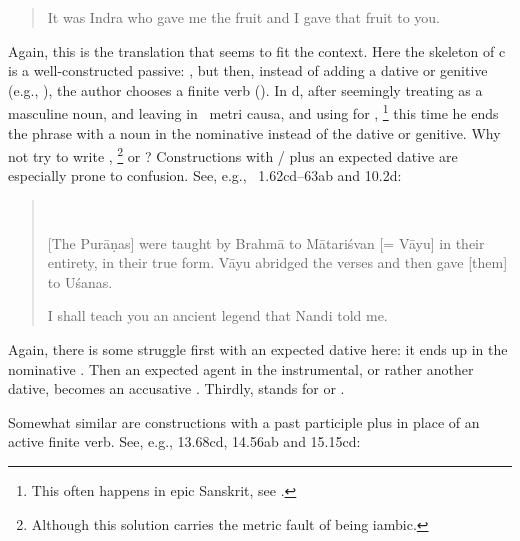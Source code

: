 \begin{quote}

It was Indra who gave me the fruit and I gave that fruit to you.
\end{quote}

\noindent
Again, this is the translation that seems to fit the context. 
Here the skeleton of  c is a well-constructed passive:
, but then, instead of adding a dative or 
genitive (e.g., ), the author chooses 
a finite verb (). In  d, after seemingly 
treating  as a masculine noun, and leaving
 in \stemform\ metri causa, and using  for ,%
		\footnote{This often happens in epic Sanskrit, see 
			.}
this time he ends the phrase with a noun in the nominative  instead of
the dative or genitive. Why not try to write ,%
		\footnote{Although this solution carries the metric fault of 
								being iambic.}
or ?
\label{kathita}Constructions with / plus an expected dative 
are especially prone to confusion. See, e.g., \VSS\ 1.62cd--63ab and 
10.2d:

\begin{quote}
\\

        [The Purāṇas] were taught by Brahmā to 
        Mātariśvan [= Vāyu] in their entirety, in their true form.
        Vāyu abridged the verses and then gave [them] to Uśanas.
        

        I shall teach you an ancient legend that Nandi told me.
\end{quote}

\noindent
Again, there is some struggle first with an expected dative here:
it ends up in the nominative . Then an expected 
agent in the instrumental, or rather another dative, 
becomes an accusative . Thirdly,
 stands for  or
. 

Somewhat similar are constructions with a 
past participle plus 
in place of an active finite verb. See, e.g.,
13.68cd, 14.56ab and 15.15cd:

